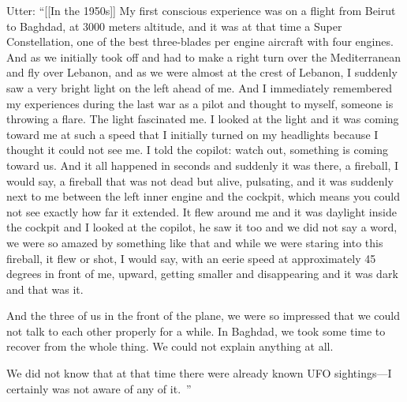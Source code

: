 \begin{svgraybox}
Utter:
``[[In the 1950s]] My first conscious experience was on a flight from Beirut to Baghdad,
at 3000 meters altitude, and it was at that time a Super Constellation,
one of the best three-blades per engine aircraft with four engines.
And as we initially took off and had to make a right turn over the Mediterranean and fly over Lebanon, and as we were almost at the crest of Lebanon,
I suddenly saw a very bright light on the left ahead of me.
And I immediately remembered my experiences during the last war as a pilot and thought to myself, someone is throwing a flare.
The light fascinated me.
I looked at the light and it was coming toward me at such a speed that I initially turned on my headlights because I thought it could not see me.
I told the copilot: watch out, something is coming toward us.
And it all happened in seconds and suddenly it was there,
a fireball, I would say, a fireball that was not dead but alive, pulsating, and it was suddenly next to me between
the left inner engine and the cockpit, which means you could not see exactly how far it extended.
It flew around me and it was daylight inside the cockpit and I looked at the copilot,
he saw it too and we did not say a word,
we were so amazed by something like that and while we were staring into this fireball,
it flew or shot, I would say, with an eerie speed at approximately 45 degrees in front of me,
upward, getting smaller and disappearing and it was dark and that was it.

And the three of us in the front of the plane, we were so impressed that we could not talk to each other properly for a while.
In Baghdad, we took some time to recover from the whole thing. We could not explain anything at all.

We did not know that at that time there were already known UFO sightings---I certainly was not aware of any of it.~\cite{ExoMagazinTV2013Feb}''
\end{svgraybox}


